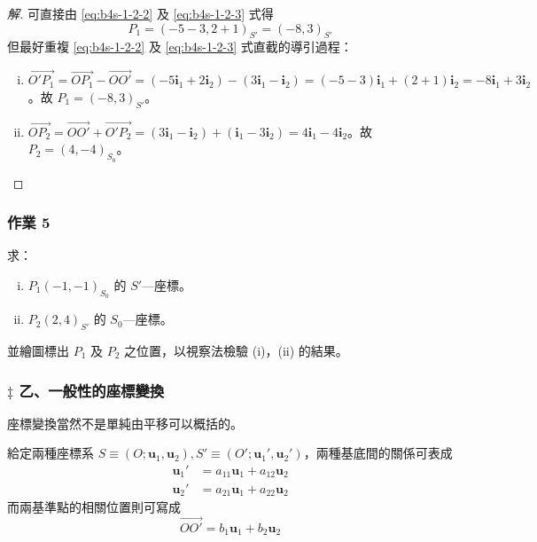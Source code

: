 \begin{proof}[解]
可直接由 \eqref{eq:b4s-1-2-2} 及 \eqref{eq:b4s-1-2-3} 式得
\[ P_1 = (-5-3, 2+1)_{S'} = (-8, 3)_{S'} \]
但最好重複 \eqref{eq:b4s-1-2-2} 及 \eqref{eq:b4s-1-2-3} 式直截的導引過程：
\begin{enumerate}[(i)]
  \item $\vec{O'P_1} = \vec{OP_1} - \vec{OO'} = (-5\mathbf{i}_1 + 2\mathbf{i}_2) - (3\mathbf{i}_1 - \mathbf{i}_2) = (-5-3)\mathbf{i}_1 + (2+1)\mathbf{i}_2 = -8\mathbf{i}_1 + 3\mathbf{i}_2$。故 $P_1 = (-8, 3)_{S'}$。
  \item $\vec{OP_2} = \vec{OO'} + \vec{O'P_2} = (3\mathbf{i}_1 - \mathbf{i}_2) + (\mathbf{i}_1 - 3\mathbf{i}_2) = 4\mathbf{i}_1 - 4\mathbf{i}_2$。故 $P_2 = (4, -4)_{S_0}$。
\end{enumerate}
\end{proof}

\subsubsection*{作業 5}
求：
\begin{enumerate}[(i)]
  \item $P_1(-1, -1)_{S_0}$ 的 $S'$---座標。
  \item $P_2(2, 4)_{S'}$ 的 $S_0$---座標。
\end{enumerate}
並繪圖標出 $P_1$ 及 $P_2$ 之位置，以視察法檢驗 (i)，(ii) 的結果。

\subsubsection*{$\ddagger$ 乙、一般性的座標變換}

座標變換當然不是單純由平移可以概括的。

給定兩種座標系 $S \equiv (O; \mathbf{u}_1, \mathbf{u}_2), S' \equiv (O'; \mathbf{u}_1', \mathbf{u}_2')$，兩種基底間的關係可表成
\begin{align}
\mathbf{u}_1' &= a_{11} \mathbf{u}_1 + a_{12} \mathbf{u}_2 \label{eq:b4s-1-2-4} \\
\mathbf{u}_2' &= a_{21} \mathbf{u}_1 + a_{22} \mathbf{u}_2 \nonumber
\end{align}
而兩基準點的相關位置則可寫成
\begin{equation}
\vec{OO'} = b_1 \mathbf{u}_1 + b_2 \mathbf{u}_2 \label{eq:b4s-1-2-4p}
\end{equation}


